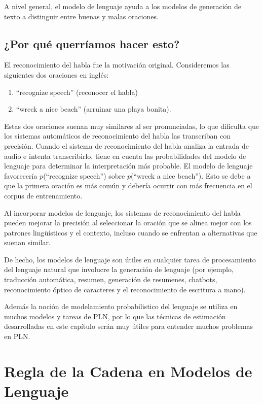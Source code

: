 A nivel general, el modelo de lenguaje ayuda a los modelos de generación de texto a distinguir entre buenas y malas oraciones.



\subsection{¿Por qué querríamos hacer esto?}

El reconocimiento del habla fue la motivación original. Consideremos las siguientes dos oraciones en inglés:
\begin{enumerate}
 \item ``recognize speech''  (reconocer el habla)
 \item ``wreck a nice beach'' (arruinar una playa bonita).
\end{enumerate}

Estas dos oraciones suenan muy similares al ser pronunciadas, lo que dificulta que los sistemas automáticos de reconocimiento del habla las transcriban con precisión. Cuando el sistema de reconocimiento del habla analiza la entrada de audio e intenta transcribirlo, tiene en cuenta las probabilidades del modelo de lenguaje para determinar la interpretación más probable.
El modelo de lenguaje favorecería $p$(``recognize speech'') sobre $p$(``wreck a nice beach'').
Esto se debe a que la primera oración es más común y debería ocurrir con más frecuencia en el corpus de entrenamiento.

Al incorporar modelos de lenguaje, los sistemas de reconocimiento del habla pueden mejorar  la precisión al seleccionar la oración que se alinea mejor con los patrones lingüísticos y el contexto, incluso cuando se enfrentan a alternativas que suenan similar.

De hecho, los modelos de lenguaje son útiles en cualquier tarea de procesamiento del lenguaje natural que involucre la generación de lenguaje (por ejemplo, traducción automática, resumen, generación de resumenes, chatbots,  reconocimiento óptico de caracteres y el reconocimiento de escritura a mano).

Además la noción de modelamiento probabilistico del lenguaje se utiliza en muchos modelos y tareas de PLN, por lo que las técnicas de estimación desarrolladas en este capítulo serán muy útiles para entender muchos problemas en PLN.


\section{Regla de la Cadena en Modelos de Lenguaje}

